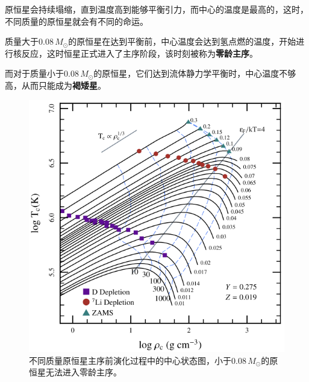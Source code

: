 原恒星会持续塌缩，直到温度高到能够平衡引力，而中心的温度是最高的，这时，不同质量的原恒星就会有不同的命运。

质量大于$0.08\,M_\odot$的原恒星在达到平衡前，中心温度会达到氢点燃的温度，开始进行核反应，这时恒星正式进入了主序阶段，该时刻被称为\textbf{零龄主序}。

而对于质量小于$0.08\,M_\odot$的原恒星，它们达到流体静力学平衡时，中心温度不够高，从而只能成为\textbf{褐矮星}。

\begin{figure}[hbt]
  \centering
  \includegraphics[width=12cm]{chapters/12/prems}
  \caption{不同质量原恒星主序前演化过程中的中心状态图，小于$0.08\,M_\odot$的原恒星无法进入零龄主序。}
  \label{}
\end{figure}
